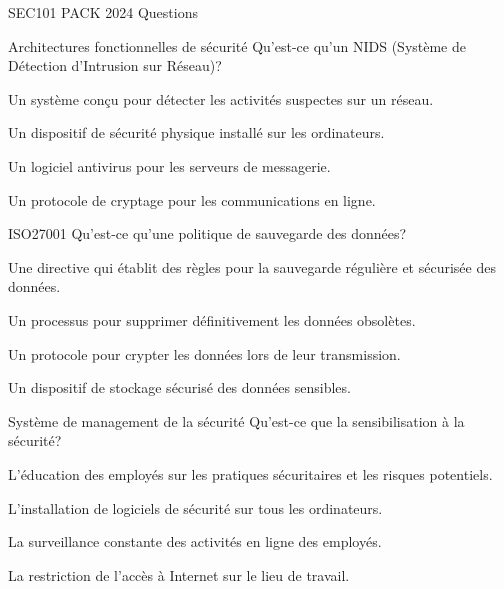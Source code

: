 \documentclass[12pt]{article}
\begin{document}
\begin{quiz}{SEC101 PACK 2024 Questions}
\begin{multi}[points=1]{Architectures fonctionnelles de sécurité}
Qu'est-ce qu'un NIDS (Système de Détection d'Intrusion sur Réseau)?
\item* Un système conçu pour détecter les activités suspectes sur un réseau.
\item Un dispositif de sécurité physique installé sur les ordinateurs.
\item Un logiciel antivirus pour les serveurs de messagerie.
\item Un protocole de cryptage pour les communications en ligne.
\end{multi}

\begin{multi}[points=1]{ISO27001}
Qu'est-ce qu'une politique de sauvegarde des données?
\item* Une directive qui établit des règles pour la sauvegarde régulière et sécurisée des données.
\item Un processus pour supprimer définitivement les données obsolètes.
\item Un protocole pour crypter les données lors de leur transmission.
\item Un dispositif de stockage sécurisé des données sensibles.
\end{multi}

\begin{multi}[points=1]{Système de management de la sécurité}
Qu'est-ce que la sensibilisation à la sécurité?
\item* L'éducation des employés sur les pratiques sécuritaires et les risques potentiels.
\item L'installation de logiciels de sécurité sur tous les ordinateurs.
\item La surveillance constante des activités en ligne des employés.
\item La restriction de l'accès à Internet sur le lieu de travail.
\end{multi}




\end{quiz}

 
\end{document}
